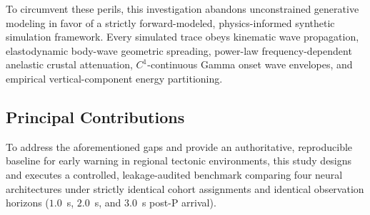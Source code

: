 \documentclass[journal]{IEEEtran}
\begin{document}
To circumvent these perils, this investigation abandons unconstrained generative modeling in favor of a strictly forward-modeled, physics-informed synthetic simulation framework. Every simulated trace obeys kinematic wave propagation, elastodynamic body-wave geometric spreading, power-law frequency-dependent anelastic crustal attenuation, $C^1$-continuous Gamma onset wave envelopes, and empirical vertical-component energy partitioning.

\subsection{Principal Contributions}
To address the aforementioned gaps and provide an authoritative, reproducible baseline for early warning in regional tectonic environments, this study designs and executes a controlled, leakage-audited benchmark comparing four neural architectures under strictly identical cohort assignments and identical observation horizons ($1.0$~s, $2.0$~s, and $3.0$~s post-P arrival).
\end{document}
